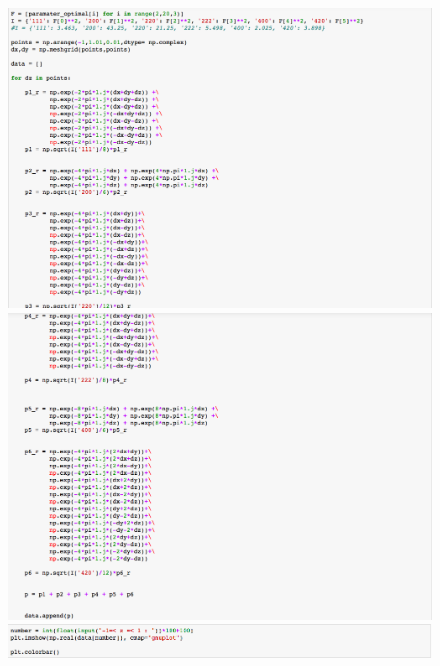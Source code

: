 \documentclass[a4paper,12pt]{jarticle}
\begin{document}
  \begin{figure}[htbp]
    \begin{center}
     \includegraphics[clip,width=14.0cm]{py_2.png}
     \includegraphics[clip,width=14.0cm]{py_3.png}
     \includegraphics[clip,width=14.0cm]{py_4.png}
    \end{center}
   \end{figure}
  
\end{document}
